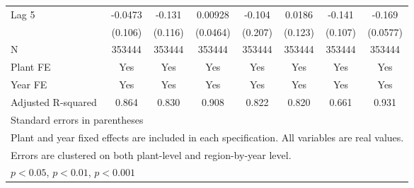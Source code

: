 \begin{table}[htbp]
\begin{tabular}{l*{7}{c}}
\addlinespace
Lag 5           &  -0.0473         &   -0.131         &  0.00928         &   -0.104         &   0.0186         &   -0.141         &   -0.169\sym{**} \\
                &  (0.106)         &  (0.116)         & (0.0464)         &  (0.207)         &  (0.123)         &  (0.107)         & (0.0577)         \\
\midrule
N               &   353444         &   353444         &   353444         &   353444         &   353444         &   353444         &   353444         \\
Plant FE        &      Yes         &      Yes         &      Yes         &      Yes         &      Yes         &      Yes         &      Yes         \\
Year FE         &      Yes         &      Yes         &      Yes         &      Yes         &      Yes         &      Yes         &      Yes         \\
Adjusted R-squared&    0.864         &    0.830         &    0.908         &    0.822         &    0.820         &    0.661         &    0.931         \\
\bottomrule
\multicolumn{8}{l}{\footnotesize Standard errors in parentheses}\\
\multicolumn{8}{l}{\footnotesize Plant and year fixed effects are included in each specification. All variables are real values.}\\
\multicolumn{8}{l}{\footnotesize Errors are clustered on both plant-level and region-by-year level.}\\
\multicolumn{8}{l}{\footnotesize \sym{*} \(p<0.05\), \sym{**} \(p<0.01\), \sym{***} \(p<0.001\)}\\
\end{tabular}
\end{table}
